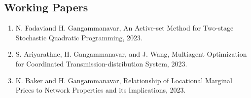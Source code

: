 \documentclass[hyperref, margin]{myResume}
\begin{document}
\begin{resume}
 \section{Working Papers}
\begin{enumerate}[label=W\arabic*., leftmargin=*]
	\item N. Fadavi\footnotemark[1] and H. Gangammanavar, An Active-set Method for Two-stage Stochastic Quadratic Programming, 2023.
	\item S. Ariyarathne\footnotemark[1], H. Gangammanavar, and J. Wang, Multiagent Optimization for Coordinated Transmission-distribution System, 2023.
	\item K. Baker and H. Gangammanavar, Relationship of Locational Marginal Prices to Network Properties and its Implications, 2023.	
\end{enumerate}


\end{resume}
\end{document}
